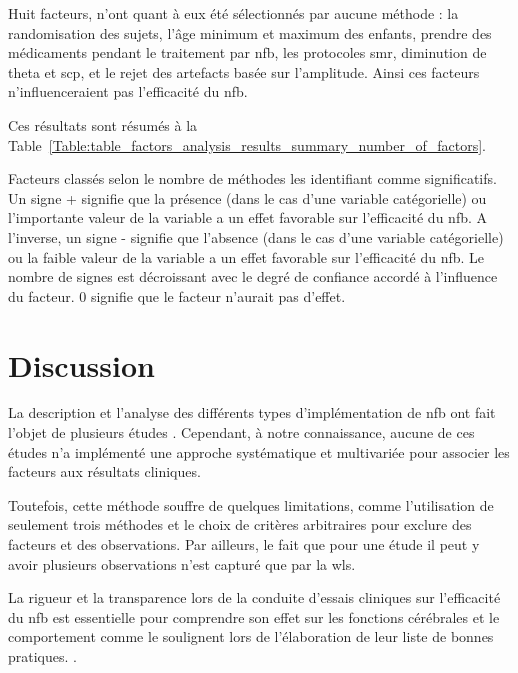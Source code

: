 Huit facteurs, n'ont quant à eux été sélectionnés par aucune méthode : la randomisation des sujets, l'âge minimum et maximum des enfants, prendre des 
médicaments pendant le traitement par \gls{nfb}, les protocoles \gls{smr}, diminution de theta et \gls{scp}, et le rejet
des artefacts basée sur l'amplitude. Ainsi ces facteurs n'influenceraient pas l'efficacité du \gls{nfb}. 

Ces résultats sont résumés à la Table~\ref{Table:table_factors_analysis_results_summary_number_of_factors}.

\begin{table}[h!]
  \centering
  \caption{Facteurs classés selon le nombre de méthodes les identifiant comme significatifs. Un signe + signifie que la présence (dans le cas d'une variable catégorielle) ou l'importante valeur
	de la variable a un effet favorable sur l'efficacité du \gls{nfb}. A l'inverse, un signe - signifie que l'absence (dans le cas d'une variable catégorielle) ou la faible valeur
	de la variable a un effet favorable sur l'efficacité du \gls{nfb}. Le nombre de signes est décroissant avec le degré de confiance accordé à l'influence du facteur. 0 signifie 
	que le facteur n'aurait pas d'effet.}
  
  \label{Table:table_factors_analysis_results_summary_number_of_factors}
\end{table}

\section{Discussion}

La description et l'analyse des différents types d'implémentation de \gls{nfb} ont fait l'objet de plusieurs études \citep{Arns2014, 
Jeunet2018, Arns2009, Cortese2016, Alkoby2017}. Cependant, à notre connaissance, aucune de ces études n'a implémenté une approche systématique et 
multivariée pour associer les facteurs aux résultats cliniques. 

Toutefois, cette méthode souffre de quelques limitations, comme 
l'utilisation de seulement trois méthodes et le choix de critères arbitraires pour exclure des facteurs et des observations. Par ailleurs, le fait que pour une étude il peut y 
avoir plusieurs observations n'est capturé que par la \gls{wls}. 

La rigueur et la transparence lors de la conduite d'essais cliniques sur l'efficacité
du \gls{nfb} est essentielle pour comprendre son effet sur les fonctions cérébrales et le comportement comme le soulignent \citet{Ros2019} lors de l'élaboration
de leur liste de bonnes pratiques. 
. 

